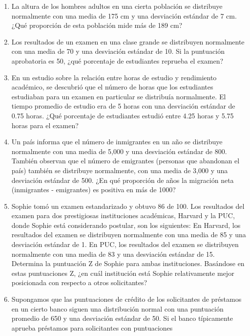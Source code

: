 \documentclass[
  letterpaper,
  DIV=11,
  numbers=noendperiod]{scrartcl}
\begin{document}
\begin{enumerate}
  como una variable aleatoria continua, distribuida normalmente con una
  media de 1000mm y una desviación estándar de 150mm. Encuentra la
  probabilidad de que en un año dado, la precipitación esté entre 800mm
  y 1200mm.
\item
  La altura de los hombres adultos en una cierta población se distribuye
  normalmente con una media de 175 cm y una desviación estándar de 7 cm.
  ¿Qué proporción de esta población mide más de 189 cm?
\item
  Los resultados de un examen en una clase grande se distribuyen
  normalmente con una media de 70 y una desviación estándar de 10. Si la
  puntuación aprobatoria es 50, ¿qué porcentaje de estudiantes reprueba
  el examen?
\item
  En un estudio sobre la relación entre horas de estudio y rendimiento
  académico, se descubrió que el número de horas que los estudiantes
  estudiaban para un examen en particular se distribuía normalmente. El
  tiempo promedio de estudio era de 5 horas con una desviación estándar
  de 0.75 horas. ¿Qué porcentaje de estudiantes estudió entre 4.25 horas
  y 5.75 horas para el examen?
\item
  Un país informa que el número de inmigrantes en un año se distribuye
  normalmente con una media de 5,000 y una desviación estándar de 800.
  También observan que el número de emigrantes (personas que abandonan
  el país) también se distribuye normalmente, con una media de 3,000 y
  una desviación estándar de 500. ¿En qué proporción de años la
  migración neta (inmigrantes - emigrantes) es positiva en más de 1000?
\item
  Sophie tomó un examen estandarizado y obtuvo 86 de 100. Los resultados
  del examen para dos prestigiosas instituciones académicas, Harvard y
  la PUC, donde Sophie está considerando postular, son los siguientes:
  En Harvard, los resultados del examen se distribuyen normalmente con
  una media de 85 y una desviación estándar de 1. En PUC, los resultados
  del examen se distribuyen normalmente con una media de 83 y una
  desviación estándar de 15. Determina la puntuación Z de Sophie para
  ambas instituciones. Basándose en estas puntuaciones Z, ¿en cuál
  institución está Sophie relativamente mejor posicionada con respecto a
  otros solicitantes?
\item
  Supongamos que las puntuaciones de crédito de los solicitantes de
  préstamos en un cierto banco siguen una distribución normal con una
  puntuación promedio de 650 y una desviación estándar de 50. Si el
  banco típicamente aprueba préstamos para solicitantes con puntuaciones

\end{enumerate}
\end{document}
